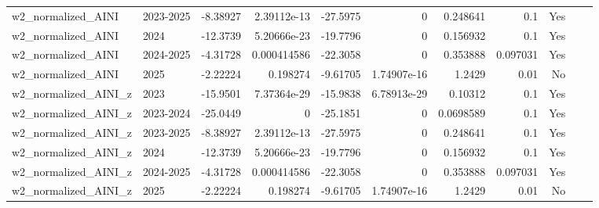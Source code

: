 \begin{longtable}{llrrrrrrrrl}
w2\_normalized\_AINI & 2023-2025 & -8.38927 & 2.39112e-13 & -27.5975 & 0 & 0.248641 & 0.1 & Yes &  \\
w2\_normalized\_AINI & 2024 & -12.3739 & 5.20666e-23 & -19.7796 & 0 & 0.156932 & 0.1 & Yes &  \\
w2\_normalized\_AINI & 2024-2025 & -4.31728 & 0.000414586 & -22.3058 & 0 & 0.353888 & 0.097031 & Yes &  \\
w2\_normalized\_AINI & 2025 & -2.22224 & 0.198274 & -9.61705 & 1.74907e-16 & 1.2429 & 0.01 & No &  \\
w2\_normalized\_AINI\_z & 2023 & -15.9501 & 7.37364e-29 & -15.9838 & 6.78913e-29 & 0.10312 & 0.1 & Yes &  \\
w2\_normalized\_AINI\_z & 2023-2024 & -25.0449 & 0 & -25.1851 & 0 & 0.0698589 & 0.1 & Yes &  \\
w2\_normalized\_AINI\_z & 2023-2025 & -8.38927 & 2.39112e-13 & -27.5975 & 0 & 0.248641 & 0.1 & Yes &  \\
w2\_normalized\_AINI\_z & 2024 & -12.3739 & 5.20666e-23 & -19.7796 & 0 & 0.156932 & 0.1 & Yes &  \\
w2\_normalized\_AINI\_z & 2024-2025 & -4.31728 & 0.000414586 & -22.3058 & 0 & 0.353888 & 0.097031 & Yes &  \\
w2\_normalized\_AINI\_z & 2025 & -2.22224 & 0.198274 & -9.61705 & 1.74907e-16 & 1.2429 & 0.01 & No &  \\
\end{longtable}
